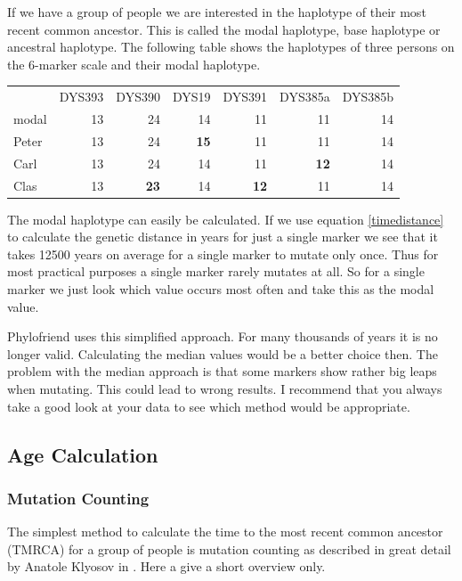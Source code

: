 If we have a group of people we are interested in the
haplotype of their most recent common ancestor. This is
called the modal haplotype, base haplotype or ancestral
haplotype. The following table shows the haplotypes of three
persons on the 6-marker scale and their modal haplotype.

\vspace{1em}
\begin{tabular}{lrrrrrr} \label{tblmodalhaplotype}
       & DYS393 & DYS390      & DYS19       & DYS391      & DYS385a     & DYS385b \\
modal  &     13 & 24          & 14          & 11          & 11          & 14 \\
Peter  &     13 & 24          & \textbf{15} & 11          & 11          & 14 \\
Carl   &     13 & 24          & 14          & 11          & \textbf{12} & 14 \\
Clas   &     13 & \textbf{23} & 14          & \textbf{12} & 11          & 14
\end{tabular}
\vspace{1em}

The modal haplotype can easily be calculated. If we use
equation \ref{timedistance} to calculate the genetic distance
in years for just a single marker we see that it takes 12500
years on average for a single marker to mutate only once. 
Thus for most practical purposes a single marker rarely mutates
at all. So for a single marker we just look which value occurs
most often and take this as the modal value.

Phylofriend uses this simplified approach. For many thousands
of years it is no longer valid. Calculating the median values
would be a better choice then. The problem with the median
approach is that some markers show rather big leaps when mutating.
This could lead to wrong results. I recommend that you always
take a good look at your data to see which method would be
appropriate.


\subsection{Age Calculation}

\subsubsection{Mutation Counting}

The simplest method to calculate the time to the most recent
common ancestor (TMRCA) for a group of people is mutation
counting as described in great detail by Anatole Klyosov in
\cite{Kly09}. Here a give a short overview only.

